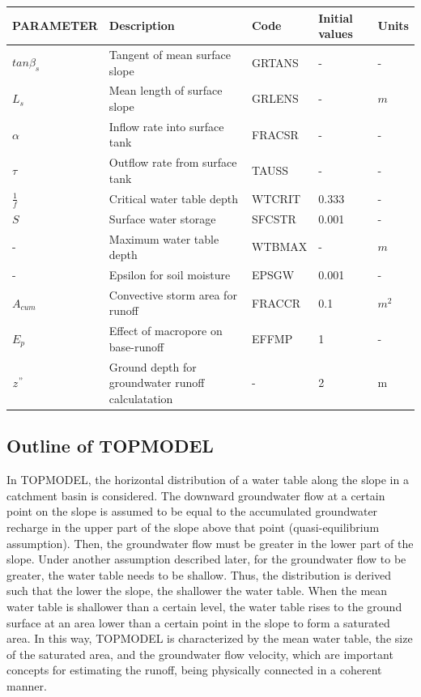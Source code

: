 \begin{landscape}

\begin{longtable}[]{@{}lllll@{}}
\toprule
PARAMETER & Description & Code & Initial values & Units \\
\midrule
\endhead
\(tan\beta_s\) & Tangent of mean surface slope & GRTANS & - & - \\
\(L_s\) & Mean length of surface slope & GRLENS & - & \(m\) \\
\(\alpha\) & Inflow rate into surface tank & FRACSR & - & - \\
\(\tau\) & Outflow rate from surface tank & TAUSS & - & - \\
\(\frac1f\) & Critical water table depth & WTCRIT & 0.333 & - \\
\(S\) & Surface water storage & SFCSTR & 0.001 & - \\
- & Maximum water table depth & WTBMAX & - & \(m\) \\
- & Epsilon for soil moisture & EPSGW & 0.001 & - \\
\(A_{cum}\) & Convective storm area for runoff & FRACCR & 0.1 & \(m^2\) \\
\(E_p\) & Effect of macropore on base-runoff & EFFMP & 1 & - \\
\(z^"\) & Ground depth for groundwater runoff calculatation & - & 2 & m \\
\bottomrule
\end{longtable}

\end{landscape}

\hypertarget{outline-of-topmodel}{%
\subsection{Outline of TOPMODEL}\label{outline-of-topmodel}}

In TOPMODEL, the horizontal distribution of a water table along the slope in a catchment basin is considered. The downward groundwater flow at a certain point on the slope is assumed to be equal to
the accumulated groundwater recharge in the upper part of the slope above that point (quasi-equilibrium assumption). Then, the groundwater flow must be greater in the lower part of the slope. Under
another assumption described later, for the groundwater flow to be greater, the water table needs to be shallow. Thus, the distribution is derived such that the lower the slope, the shallower the
water table. When the mean water table is shallower than a certain level, the water table rises to the ground surface at an area lower than a certain point in the slope to form a saturated area. In
this way, TOPMODEL is characterized by the mean water table, the size of the saturated area, and the groundwater flow velocity, which are important concepts for estimating the runoff, being physically
connected in a coherent manner.

